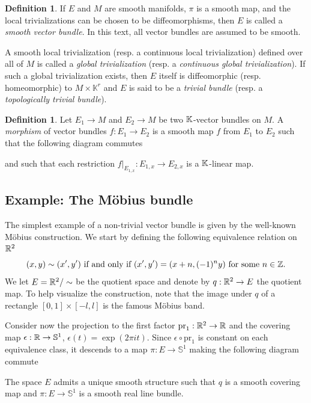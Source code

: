 \documentclass[11pt,a4paper]{book}
\theoremstyle{remark} \newtheorem{rmk}[thm]{Remark}
\theoremstyle{definition} \newtheorem{defn}[thm]{Definition}
\theoremstyle{definition} \newtheorem{ex}[thm]{Example}
\theoremstyle{definition} \newtheorem{ej}[thm]{Exercise}
\begin{document}
\begin{defn}
  If $E$ and $M$ are smooth manifolds, $\pi$ is a smooth map, and the local trivializations can be chosen to be diffeomorphisms, then $E$ is called a \emph{smooth vector bundle}. In this text, all vector bundles are assumed to be smooth.

  A smooth local trivialization (resp. a continuous local trivialization) defined over all of $M$ is called a \emph{global trivialization} (resp. a \emph{continuous global trivialization}). If such a global trivialization exists, then $E$ itself is diffeomorphic (resp. homeomorphic) to $M\times \mathbb{K}^r$ and $E$ is said to be a \emph{trivial bundle} (resp. a \emph{topologically trivial bundle}).
\end{defn}

\begin{defn}
Let $E_1\rightarrow M$ and $E_2\rightarrow M$ be two $\mathbb K$-vector bundles on $M$. A \emph{morphism} of vector bundles $f:E_1\rightarrow E_2$ is a smooth map $f$ from $E_1$ to $E_2$ such that the following diagram commutes
\begin{center}
\end{center}
and such that each restriction $f|_{E_{1,x}}:E_{1,x}\rightarrow E_{2,x}$ is a $\mathbb K$-linear map.
\end{defn}


\subsection{Example: The Möbius bundle}
The simplest example of a non-trivial vector bundle is given by the well-known Möbius construction. We start by defining the following equivalence relation on $\mathbb R^2$
\begin{equation*}
(x,y) \sim (x' ,y' ) \text{ if and only if } (x' ,y' )= (x+n, (-1)^n y) \text{ for some } n \in \mathbb Z.
\end{equation*}
We let $E=\mathbb R^2/\sim$ be the quotient space and denote by $q:\mathbb R^2 \rightarrow E$ the quotient map. To help visualize the construction, note that the image under $q$ of a rectangle $[0,1]\times [-l,l]$ is the famous Möbius band.

Consider now the projection to the first factor $\mathrm{pr}_1:\mathbb R^2\rightarrow \mathbb R$ and the covering map $\epsilon:\mathbb R\rightarrow \mathbb{S}^1$, $\epsilon(t)=\exp(2\pi i t)$. Since $\epsilon \circ \mathrm{pr}_1$ is constant on each equivalence class, it descends to a map $\pi:E\rightarrow \mathbb{S}^1$ making the following diagram commute
\begin{center}
\end{center}
The space $E$ admits a unique smooth structure such that $q$ is a smooth covering map and $\pi:E\rightarrow \mathbb{S}^1$ is a smooth real line bundle.
\end{document}
